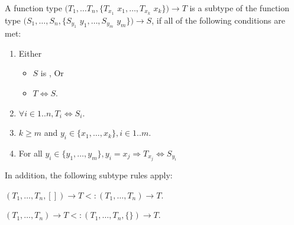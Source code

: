 \documentclass{article}
\begin{document}
\LMHash{}
A function type $(T_1, \ldots T_n, \{T_{x_1}$ $x_1, \ldots, T_{x_k}$ $x_k\}) \rightarrow T$ is a subtype of the function type $(S_1, \ldots, S_n, \{S_{y_1}$ $y_1, \ldots, S_{y_m}$ $y_m\}) \rightarrow S$, if all of the following conditions are met:
\begin{enumerate}
\item Either
\begin{itemize}
\item $S$ is \VOID{}, Or
\item $T \Longleftrightarrow S$.
\end{itemize}
\item $\forall i \in 1 .. n, T_i \Longleftrightarrow S_i$.
\item $k \ge m$ and $y_i \in \{x_1, \ldots, x_k\}, i \in 1 .. m$.
\item For all $y_i \in \{y_1, \ldots, y_m\}, y_i = x_j \Rightarrow T_{x_j} \Longleftrightarrow S_{y_i}$
\end{enumerate}





\LMHash{}
In addition, the following subtype rules apply:

$(T_1, \ldots, T_n, []) \rightarrow T <: (T_1, \ldots, T_n) \rightarrow T$.

$(T_1, \ldots, T_n) \rightarrow T <: (T_1, \ldots, T_n, \{\}) \rightarrow T$.
\end{document}
